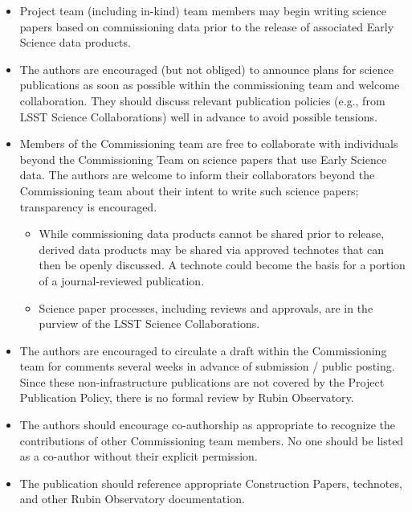 \documentclass[SE,authoryear,toc,lsstdraft]{lsstdoc}
\begin{document}
\begin{itemize}

  \item Project team (including in-kind) team members may begin writing science papers based on commissioning data prior to the release of associated Early Science data products.

  \item The authors are encouraged (but not obliged) to announce plans for science publications as soon as possible within the commissioning team and welcome collaboration. They should discuss relevant publication policies (e.g., from LSST Science Collaborations) well in advance to avoid possible tensions.

  \item Members of the Commissioning team are free to collaborate with individuals beyond the Commissioning Team on science papers that use Early Science data. The authors are welcome to inform their collaborators beyond the Commissioning team about their intent to write such science papers; transparency is encouraged.

  \begin{itemize}

   \item  While commissioning data products cannot be shared prior to release, derived data products may be shared via approved technotes that can then be openly discussed. A technote could become the basis for a portion of a journal-reviewed publication.

   \item Science paper processes, including reviews and approvals, are in the purview of the LSST Science Collaborations.

  \end{itemize}

  \item The authors are encouraged to circulate a draft within the Commissioning team for comments several weeks in advance of submission / public posting.
  Since these non-infrastructure publications are not covered by the Project Publication Policy, there is no formal review by Rubin Observatory.

  \item The authors should encourage co-authorship as appropriate to recognize the contributions of other Commissioning team members. No one should be listed as a co-author without their explicit permission.

  \item The publication should reference appropriate Construction Papers, technotes, and other Rubin Observatory documentation.

\end{itemize}
\end{document}
